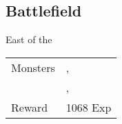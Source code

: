 \subsection{Battlefield}
\label{map:battlefield_18}

East of the 

\noindent\begin{tabularx}{\textwidth}[l]{lX}
	Monsters
	& \nameref{monster:stheno}, \nameref{monster:stheno} \\
	& \nameref{monster:iflyte}, \nameref{monster:iflyte}
\\ \hline
	Reward & 1068 Exp
\end{tabularx}
